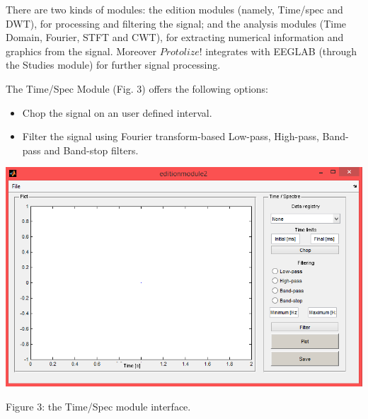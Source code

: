 \documentclass[12pt, a4paper]{article}
\begin{document}
There are two kinds of modules: the edition modules (namely, Time/spec and DWT), for processing and filtering the signal; and the analysis modules (Time Domain, Fourier, STFT and CWT), for extracting numerical information and graphics from the signal. Moreover $Protolize!$ integrates with EEGLAB (through the Studies module) for further signal processing.

The Time/Spec Module (Fig. 3) offers the following options:
\begin{itemize}
\item Chop the signal on an user defined interval.
\item Filter the signal using Fourier transform-based Low-pass, High-pass, Band-pass and Band-stop filters.
\end{itemize}
\begin{center}
\includegraphics[width=15cm]{timespec.png}

Figure 3: the Time/Spec module interface.
\end{center}
\end{document}
